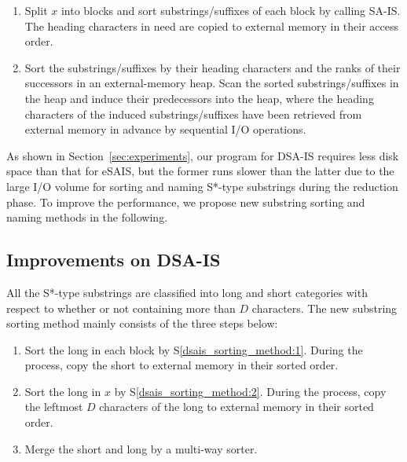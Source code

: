 \documentclass[10pt,journal,compsoc]{IEEEtran}
\begin{document}
\begin{enumerate}[S1]
	
	\item Split $x$ into blocks and sort substrings/suffixes of each block by calling SA-IS. The heading characters in need are copied to external memory in their access order. \label{dsais_sorting_method:1}
	
	\item Sort the substrings/suffixes by their heading characters and the ranks of their successors in an external-memory heap. Scan the sorted substrings/suffixes in the heap and induce their predecessors into the heap, where the heading characters of the induced substrings/suffixes have been retrieved from external memory in advance by sequential I/O operations. \label{dsais_sorting_method:2}
\end{enumerate}

As shown in Section~\ref{sec:experiments}, our program for DSA-IS requires less disk space than that for eSAIS, but the former runs slower than the latter due to the large I/O volume for sorting and naming S*-type substrings during the reduction phase. To improve the performance, we propose new substring sorting and naming methods in the following.

\subsection{Improvements on DSA-IS}

All the S*-type substrings are classified into long and short categories with respect to whether or not containing more than $D$ characters. The new substring sorting method mainly consists of the three steps below:

\begin{enumerate}[S1']
	\item Sort the long in each block by S\ref{dsais_sorting_method:1}. During the process, copy the short to external memory in their sorted order.~\label{dsaism_sorting_method:1}
	
	\item Sort the long in $x$ by S\ref{dsais_sorting_method:2}. During the process, copy the leftmost $D$ characters of the long to external memory in their sorted order.~\label{dsaism_sorting_method:2}
	
	\item Merge the short and long by a multi-way sorter.~\label{dsaism_sorting_method:3}
\end{enumerate}
\end{document}
